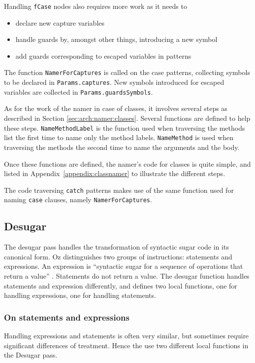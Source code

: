 \documentclass[a4paper]{memoir}
\begin{document}
Handling \lstinline!fCase! nodes also requires more work as it needs to 
\nopagebreak[4]
\begin{itemize}
  \item declare new capture variables
  \item handle guards by, amongst other things, introducing a new symbol
  \item add guards corresponding to escaped variables in patterns
\end{itemize}
The function \lstinline!NamerForCaptures! is called on the case patterns, collecting symbols
to be declared in \lstinline!Params.captures!.
New symbols introduced for escaped variables are collected in
\lstinline!Params.guardsSymbols!. 

As for the work of the namer in case of classes, it involves several steps as described
in Section \ref{sec:arch:namer:classes}.
Several functions are defined to help these steps. \lstinline!NameMethodLabel!
is the function used when traversing the methods list the first time to name
only the method labels.
\lstinline!NameMethod! is used when traversing the methods the second time to
name the arguments and the body.

Once these functions are defined, the namer's code for classes is quite simple,
and listed in Appendix~\ref{appendix:classnamer} to illustrate the different steps.


The code traversing \lstinline!catch! patterns makes use of the same
function used for naming \lstinline!case! clauses, namely
\lstinline!NamerForCaptures!.



\subsection{Desugar}\label{sec:arch:desugar}
The desugar pass handles the transformation of syntactic sugar code in its canonical form.
Oz distinguishes two groups of instructions: statements and expressions. An expression is ``syntactic sugar for a sequence of operations that return a value'' \cite{VRH04}. Statements do not return a value.
The desugar function handles statements and expression differently, and defines two local functions, one for handling expressions, one for handling statements.
\subsubsection{On statements and expressions}
Handling expressions and statements is often very similar, but sometimes require significant differences of treatment. Hence the use two different local functions in the Desugar pass.
\end{document}
